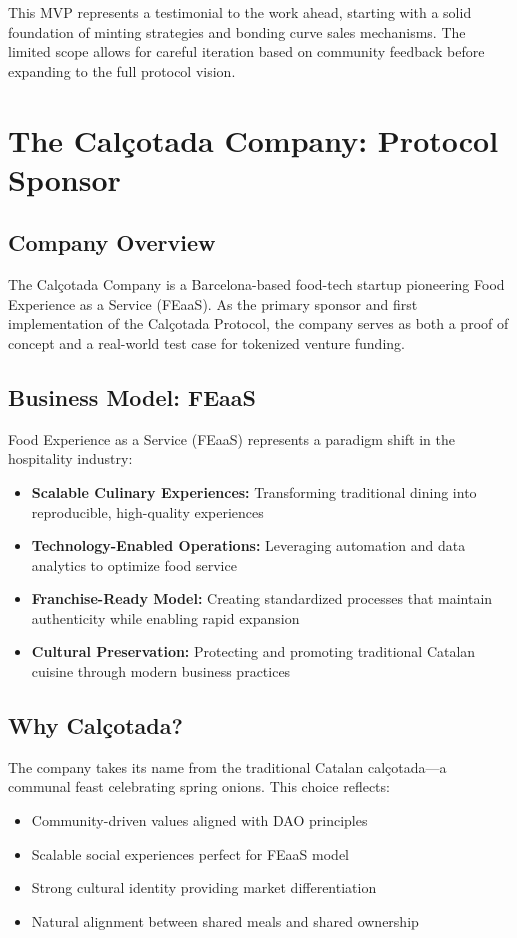 \documentclass[conference]{IEEEtran}
\begin{document}
This MVP represents a testimonial to the work ahead, starting with a solid foundation of minting strategies and bonding curve sales mechanisms. The limited scope allows for careful iteration based on community feedback before expanding to the full protocol vision.


\section{The Calçotada Company: Protocol Sponsor}

\subsection{Company Overview}

The Calçotada Company is a Barcelona-based food-tech startup pioneering Food Experience as a Service (FEaaS). As the primary sponsor and first implementation of the Calçotada Protocol, the company serves as both a proof of concept and a real-world test case for tokenized venture funding.

\subsection{Business Model: FEaaS}

Food Experience as a Service (FEaaS) represents a paradigm shift in the hospitality industry:

\begin{itemize}
    \item \textbf{Scalable Culinary Experiences:} Transforming traditional dining into reproducible, high-quality experiences
    \item \textbf{Technology-Enabled Operations:} Leveraging automation and data analytics to optimize food service
    \item \textbf{Franchise-Ready Model:} Creating standardized processes that maintain authenticity while enabling rapid expansion
    \item \textbf{Cultural Preservation:} Protecting and promoting traditional Catalan cuisine through modern business practices
\end{itemize}

\subsection{Why Calçotada?}

The company takes its name from the traditional Catalan calçotada—a communal feast celebrating spring onions. This choice reflects:
\begin{itemize}
    \item Community-driven values aligned with DAO principles
    \item Scalable social experiences perfect for FEaaS model
    \item Strong cultural identity providing market differentiation
    \item Natural alignment between shared meals and shared ownership
\end{itemize}
\end{document}
